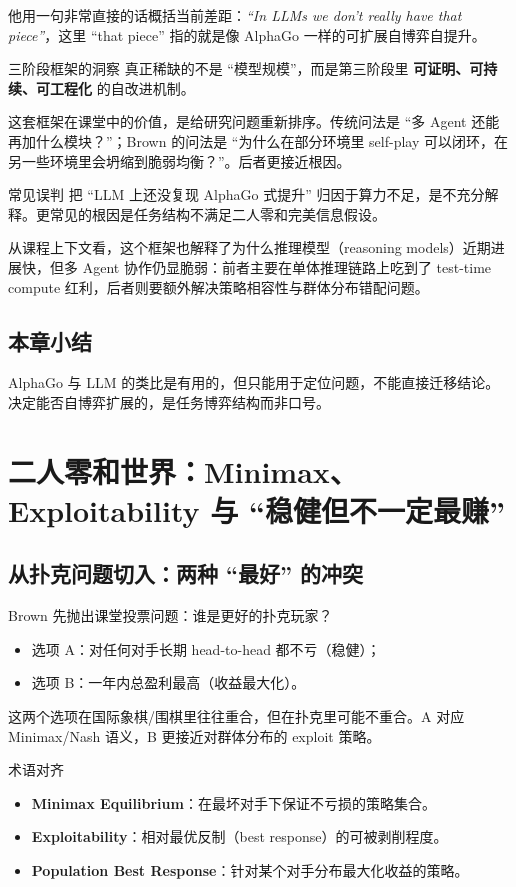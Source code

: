 \documentclass[a4paper]{article}
\begin{document}
他用一句非常直接的话概括当前差距：\textit{``In LLMs we don't really have that piece''}，这里 ``that piece'' 指的就是像 AlphaGo 一样的可扩展自博弈自提升。

\begin{importantbox}{三阶段框架的洞察}
真正稀缺的不是 ``模型规模''，而是第三阶段里 \textbf{可证明、可持续、可工程化} 的自改进机制。
\end{importantbox}

这套框架在课堂中的价值，是给研究问题重新排序。传统问法是 ``多 Agent 还能再加什么模块？''；Brown 的问法是 ``为什么在部分环境里 self-play 可以闭环，在另一些环境里会坍缩到脆弱均衡？''。后者更接近根因。

\begin{warningbox}{常见误判}
把 ``LLM 上还没复现 AlphaGo 式提升'' 归因于算力不足，是不充分解释。更常见的根因是任务结构不满足二人零和完美信息假设。
\end{warningbox}

从课程上下文看，这个框架也解释了为什么推理模型（reasoning models）近期进展快，但多 Agent 协作仍显脆弱：前者主要在单体推理链路上吃到了 test-time compute 红利，后者则要额外解决策略相容性与群体分布错配问题。

\subsection{本章小结}
AlphaGo 与 LLM 的类比是有用的，但只能用于定位问题，不能直接迁移结论。决定能否自博弈扩展的，是任务博弈结构而非口号。

\section{二人零和世界：Minimax、Exploitability 与 ``稳健但不一定最赚''}

\subsection{从扑克问题切入：两种 ``最好'' 的冲突}
Brown 先抛出课堂投票问题：谁是更好的扑克玩家？
\begin{itemize}
    \item 选项 A：对任何对手长期 head-to-head 都不亏（稳健）；
    \item 选项 B：一年内总盈利最高（收益最大化）。
\end{itemize}
这两个选项在国际象棋/围棋里往往重合，但在扑克里可能不重合。A 对应 Minimax/Nash 语义，B 更接近对群体分布的 exploit 策略。

\begin{knowledgebox}{术语对齐}
\begin{itemize}
    \item \textbf{Minimax Equilibrium}：在最坏对手下保证不亏损的策略集合。
    \item \textbf{Exploitability}：相对最优反制（best response）的可被剥削程度。
    \item \textbf{Population Best Response}：针对某个对手分布最大化收益的策略。
\end{itemize}
\end{knowledgebox}
\end{document}
